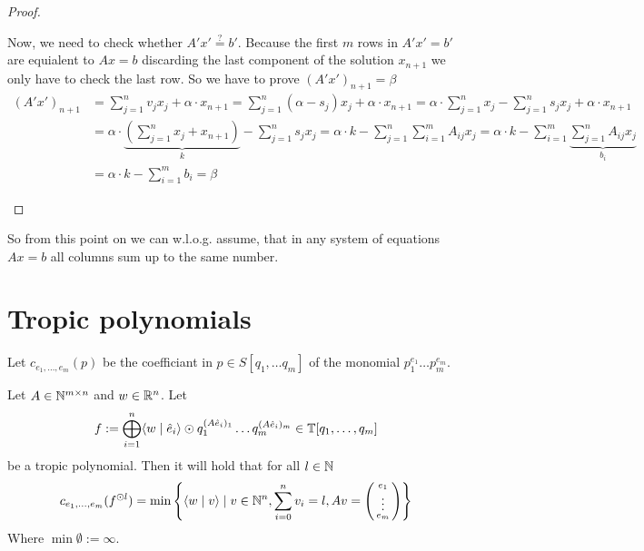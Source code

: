 \begin{proof}
\begin{itemize}
        Now, we need to check whether $A'x'\stackrel{?}{=}b'$. Because the first $m$ rows in $A'x'=b'$ are equialent to $Ax=b$ discarding the last component of the solution $x_{n+1}$ we only have to check the last row. So we have to prove $(A'x')_{n+1} = \beta$
        \begin{align*}
            (A'x')_{n+1} &= \sum_{j=1}^{n}v_jx_j + \alpha \cdot x_{n+1} = \sum_{j=1}^{n}(\alpha - s_j)x_j + \alpha \cdot x_{n+1} = \alpha \cdot \sum_{j=1}^{n}x_j - \sum_{j=1}^{n}s_jx_j + \alpha \cdot x_{n+1}\\
            &= \alpha \cdot \underbrace{\left(\sum_{j=1}^{n}x_j + x_{n+1}\right)}_k - \sum_{j=1}^{n}s_jx_j = \alpha \cdot k - \sum_{j=1}^{n}\sum_{i=1}^{m}A_{ij}x_j = \alpha\cdot k - \sum_{i=1}^{m}\underbrace{\sum_{j=1}^{n}A_{ij}x_j}_{b_i}\\
            &= \alpha\cdot k - \sum_{i=1}^{m}b_i = \beta
        \end{align*}
    \end{itemize}
\end{proof}
So from this point on we can w.l.o.g. assume, that in any system of equations $Ax=b$ all columns sum up to the same number.

\section{Tropic polynomials}
Let $c_{e_1, \dots, e_m}(p)$ be the coefficiant in $p \in S[q_1, \dots q_m]$ of the monomial $p_1^{e_1}\dots p_m^{e_m}$. 

\begin{lemma}
    \label{lemma:prem_trop_poly}
    Let $A \in \mathbb{N}^{m \times n}$ and $w \in \mathbb{R}^n$. Let
    $$f := \bigoplus_{i=1}^{n} \langle w \mid \hat e_i \rangle\odot  q_1^{(A\hat e_i)_1}\dots q_m^{(A\hat e_i)_m} \in \mathbb{T}[q_1, \dots, q_m]$$
    be a tropic polynomial. Then it will hold that for all $l \in \mathbb{N}$
    $$c_{e_1, \dots, e_m}(f^{\odot l}) = \min\left\{\langle w \mid v \rangle \mid v \in \mathbb{N}^n, \sum_{i=0}^{n}v_i = l, Av=\left(\begin{smallmatrix}e_1\\\vdots\\e_m\end{smallmatrix}\right)\right\}$$
    Where $\min\emptyset:=\infty$.
\end{lemma}


